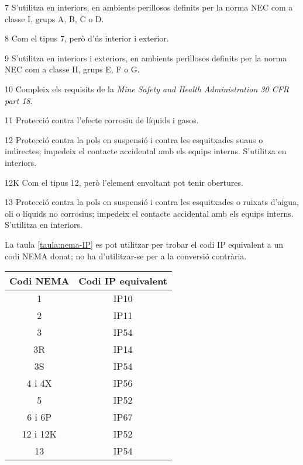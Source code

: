 \begin{list}{}
   \item[7] S'utilitza en interiors, en ambients perillosos definits per la norma NEC com a classe I, grups A, B, C o D.
   \item[8] Com el tipus 7, però d'ús interior i exterior.
   \item[9] S'utilitza en interiors i exteriors, en ambients perillosos definits per la norma NEC com a classe II, grups E, F o G.
   \item[10] Compleix els requisits de la \textit{Mine Safety and Health Administration 30 CFR part 18}.
   \item[11] Protecció contra l'efecte corrosiu de líquids i gasos.
   \item[12] Protecció contra la pols en suspensió i contra les esquitxades suaus o indirectes; impedeix el contacte accidental amb els equips interns. S'utilitza en interiors.
   \item[12K] Com el tipus 12, però l'element envoltant pot tenir obertures.
   \item[13] Protecció contra la pols en suspensió i contra les esquitxades o ruixats d'aigua, oli o líquids no corrosius; impedeix el contacte accidental amb els equips interns. S'utilitza en interiors.
\end{list}



La taula \vref{taula:nema-IP} es pot utilitzar per trobar el codi IP equivalent a un codi NEMA donat; no ha d'utilitzar-se per a la conversió contrària.

\begin{center}
   \label{taula:nema-IP}
   \begin{tabular}{cc}
   \toprule[1pt]
   Codi NEMA & Codi IP equivalent \\
   \midrule
   1 & IP10 \\
   2 & IP11 \\
   3 & IP54 \\
   3R & IP14 \\
   3S & IP54 \\
   4 i 4X & IP56 \\
   5 & IP52 \\
   6 i 6P & IP67\\
   12 i 12K & IP52 \\
   13 & IP54 \\
   \bottomrule[1pt]
   \end{tabular}
\end{center}


